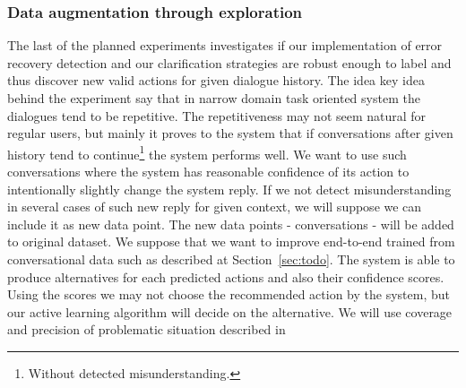 \documentclass[11pt]{article}
\begin{document}
\subsubsection*{Data augmentation through exploration}
The last of the planned experiments investigates if our implementation of error recovery detection and our clarification strategies are robust enough to label and thus discover new valid actions for given dialogue history.
The idea key idea behind the experiment say that in narrow domain task oriented system the dialogues tend to be repetitive.
The repetitiveness may not seem natural for regular users, but mainly it proves to the system that if conversations after given history tend to continue\footnote{Without detected misunderstanding.} the system performs well.
We want to use such conversations where the system has reasonable confidence of its action to intentionally slightly change the system reply.
If we not detect misunderstanding in several cases of such new reply for given context, we will suppose we can include it as new data point. 
The new data points - conversations - will be added to original dataset.
We suppose that we want to improve end-to-end trained from conversational data such as described at Section~\ref{sec:todo}.
The system is able to produce alternatives for each predicted actions and also their confidence scores.
Using the scores we may not choose the recommended action by the system, but our active learning algorithm will decide on the alternative.
We will use coverage and precision of problematic situation described in~\cite{meena_data-driven_2016}
\end{document}
